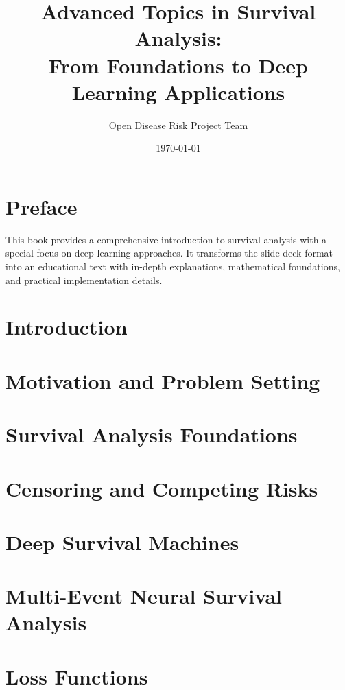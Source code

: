 \documentclass[11pt,twoside,openright]{book}
\title{Advanced Topics in Survival Analysis: \\From Foundations to Deep Learning Applications}
\author{Open Disease Risk Project Team}
\date{\today}
\begin{document}
\frontmatter


\tableofcontents

\chapter*{Preface}
This book provides a comprehensive introduction to survival analysis with a special focus on deep learning approaches. It transforms the slide deck format into an educational text with in-depth explanations, mathematical foundations, and practical implementation details.

\mainmatter

\chapter{Introduction}
\label{ch:introduction}


\chapter{Motivation and Problem Setting}
\label{ch:motivation}


\chapter{Survival Analysis Foundations}
\label{ch:foundations}


\chapter{Censoring and Competing Risks}
\label{ch:censoring}


\chapter{Deep Survival Machines}
\label{ch:dsm}


\chapter{Multi-Event Neural Survival Analysis}
\label{ch:mensa}


\chapter{Loss Functions}
\label{ch:loss-functions}

\end{document}
